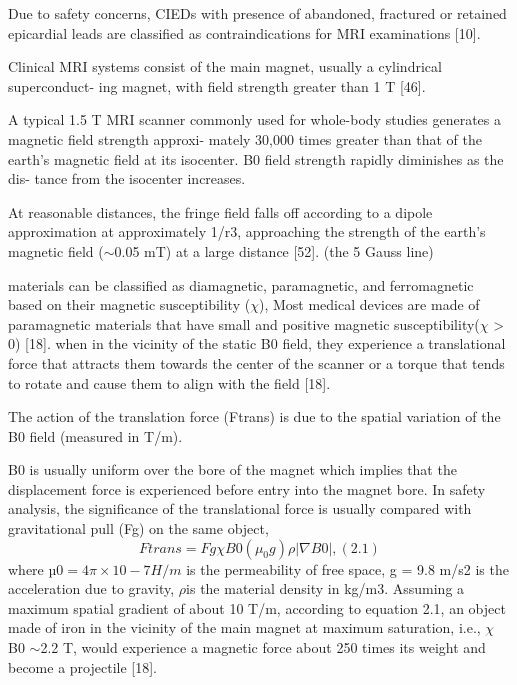 Due to safety concerns, CIEDs with presence of
abandoned, fractured or retained epicardial leads are classified as contraindications
for MRI examinations [10].

Clinical MRI systems consist of the main magnet, usually a cylindrical superconduct-
ing magnet, with field strength greater than 1 T [46].

A typical 1.5 T MRI scanner
commonly used for whole-body studies generates a magnetic field strength approxi-
mately 30,000 times greater than that of the earth’s magnetic field at its isocenter. B0 field strength rapidly diminishes as the dis-
tance from the isocenter increases.

At reasonable distances, the fringe field falls oﬀ
according to a dipole approximation at approximately 1/r3, approaching the strength
of the earth’s magnetic field ($\sim$0.05 mT) at a large distance [52]. (the 5 Gauss line)

materials can be
classified as diamagnetic, paramagnetic, and ferromagnetic based on their magnetic
susceptibility ($\chi$), Most medical devices are made of paramagnetic materials that
have small and positive magnetic susceptibility($\chi$ > 0) [18].
when in the
vicinity of the static
B0 field, they experience a translational force that attracts them
towards the center of the scanner or a torque that tends to rotate and cause them to
align with the field [18].

The action of the translation force (Ftrans) is due to the spatial variation of the
B0
field (measured in T/m).

B0 is usually uniform over the bore of the
magnet which implies that the displacement force is experienced before entry into the
magnet bore. In safety analysis, the significance of the translational force is usually
compared with gravitational pull (Fg) on the same object,
$$
Ftrans
=
Fg
\chi B0
(\mu_0g)\rho|\nabla B0|, (2.1)
$$
where $µ0 = 4π×10−7H/m$ is the permeability of free space, g = 9.8 m/s2 is the
acceleration due to gravity, $\rho$is the material density in kg/m3. Assuming a maximum
spatial gradient of about 10 T/m, according to equation 2.1, an object made of iron
in the vicinity of the main magnet at maximum saturation, i.e., $\chi$
B0 $\sim$2.2 T, would
experience a magnetic force about 250 times its weight and become a projectile [18].

